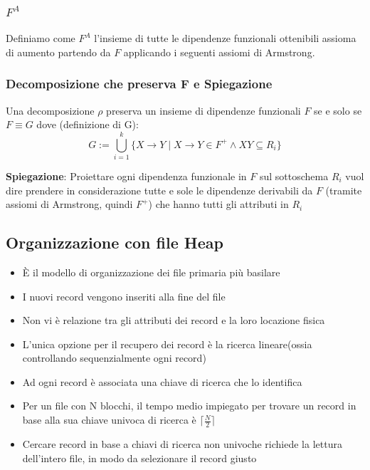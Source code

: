 \documentclass{article}
\begin{document}
\subsubsection{$F^A$}
Definiamo come $F^A$ l'insieme di tutte le dipendenze funzionali ottenibili assioma di aumento partendo da $F$ applicando i seguenti assiomi di Armstrong.

\subsubsection{Decomposizione che preserva F e Spiegazione}
Una decomposizione $\rho$ preserva un insieme di dipendenze funzionali $F$ se e solo se $F \equiv G$ dove (definizione di G):
\[ G := \bigcup_{i=1}^{k} \{X \rightarrow Y \mid X \rightarrow Y \in F^+ \land XY \subseteq R_i \} \]

\textbf{Spiegazione}: Proiettare ogni dipendenza funzionale in $F$ sul sottoschema $R_i$ vuol dire prendere in considerazione tutte e sole le dipendenze derivabili da $F$ (tramite assiomi di Armstrong, quindi $F^+$) che hanno tutti gli attributi in $R_i$


\subsection{Organizzazione con file Heap}
\begin{itemize}
  \item È il modello di organizzazione dei file primaria più basilare
  \item I nuovi record vengono inseriti alla fine del file
  \item Non vi è relazione tra gli attributi dei record e la loro locazione fisica
  \item L'unica opzione per il recupero dei record è la ricerca lineare(ossia controllando sequenzialmente ogni record)
  \item Ad ogni record è associata una chiave di ricerca che lo identifica
  \item Per un file con N blocchi, il tempo medio impiegato per trovare un record
  in base alla sua chiave univoca di ricerca è $\lceil \frac{N}{2} \rceil$
  \item Cercare record in base a chiavi di ricerca non univoche richiede la lettura dell'intero file, in modo da selezionare il record giusto
\end{itemize}
\end{document}

